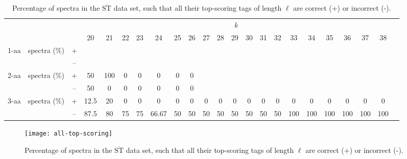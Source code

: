 \documentclass{article}[12pt]
\def\STbar{{\overline{\mathrm{ST}}}}
\begin{document}
\begin{landscape}
\begin{table}[ht]
\vspace{3mm}
\end{table}
\begin{table}[ht]\tiny
\vspace{3mm}
{\centering
\begin{center}
\begin{tabular}{|c|cc|c|c|c|c|c|c|c|c|c|c|c|c|c|c|c|c|c|c|c|c|}
  \hline
  \multicolumn{3}{|c|}{ } & \multicolumn{ 19}{|c|}{$k$} \\
  \cline{4-22 }
  \multicolumn{3}{|c|}{ } 
 & 20 & 21 & 22 & 23 & 24 & 25 & 26 & 27 & 28 & 29 & 30 & 31 & 32 & 33 & 34 & 35 & 36 & 37 & 38\\
\hline
  \multirow{2}{*}{1-aa}& \multirow{2}{*}{spectra (\%)}  &  +
 &  &  &  &  &  &  &  &  &  &  &  &  &  &  &  &  &  &  & \\
 & 
 &  --
 &  &  &  &  &  &  &  &  &  &  &  &  &  &  &  &  &  &  & \\
\hline
  \multirow{2}{*}{2-aa}& \multirow{2}{*}{spectra (\%)}  &  +
 & 50 & 100 & 0 & 0 & 0 & 0 & 0 &  &  &  &  &  &  &  &  &  &  &  & \\
 & 
 &  --
 & 50 & 0 & 0 & 0 & 0 & 0 & 0 &  &  &  &  &  &  &  &  &  &  &  & \\
\hline
  \multirow{2}{*}{3-aa}& \multirow{2}{*}{spectra (\%)}  &  +
 & 12.5 & 20 & 0 & 0 & 0 & 0 & 0 & 0 & 0 & 0 & 0 & 0 & 0 & 0 & 0 & 0 & 0 & 0 & 0\\
 & 
 &  --
 & 87.5 & 80 & 75 & 75 & 66.67 & 50 & 50 & 50 & 50 & 50 & 50 & 50 & 50 & 100 & 100 & 100 & 100 & 100 & 100 \\
  \hline
\end{tabular}
\end{center}
\par}
\centering

\caption{Percentage of spectra in the $\STbar$ data set, such that all their top-scoring tags of length $\ell$ are correct (+) or incorrect (-).}
\label{table:all-top-scoring}

\vspace{3mm}
\end{table}
\end{landscape}

\begin{figure}
  \begin{center}
\texttt{[image: all-top-scoring]}
\end{center}
\caption{Percentage of spectra in the $\STbar$ data set, such that all their top-scoring tags of length $\ell$ are correct (+) or incorrect (-).}
  \label{fig:all-top-scoring}
\end{figure}
\end{document}
